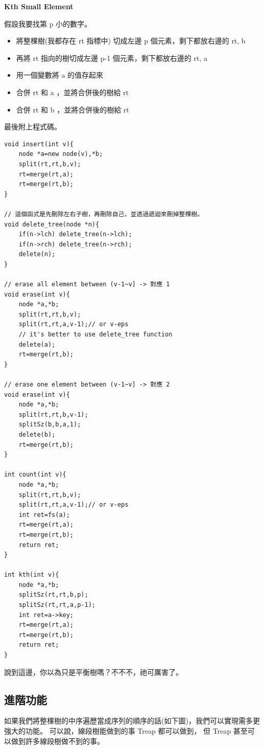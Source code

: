     \textbf{Kth Small Element}

    假設我要找第 p 小的數字。

    \begin{itemize}
        \item 將整棵樹(我都存在 rt 指標中) 切成左邊 p 個元素，剩下都放右邊的 rt, b 
        \item 再將 rt 指向的樹切成左邊 p-1 個元素，剩下都放右邊的 rt, a 
        \item 用一個變數將 a 的值存起來
        \item 合併 rt 和 a ，並將合併後的樹給 rt 
        \item 合併 rt 和 b ，並將合併後的樹給 rt
    \end{itemize}

    最後附上程式碼。

\begin{lstlisting}[caption=Treap 基本功能]
void insert(int v){
    node *a=new node(v),*b;
    split(rt,rt,b,v);
    rt=merge(rt,a);
    rt=merge(rt,b);
}

// 這個函式是先刪除左右子樹，再刪除自己，並透過遞迴來刪掉整棵樹。
void delete_tree(node *n){
    if(n->lch) delete_tree(n->lch);
    if(n->rch) delete_tree(n->rch);
    delete(n);
}

// erase all element between (v-1~v] -> 對應 1
void erase(int v){
    node *a,*b;
    split(rt,rt,b,v);
    split(rt,rt,a,v-1);// or v-eps
    // it's better to use delete_tree function
    delete(a);
    rt=merge(rt,b);
}

// erase one element between (v-1~v] -> 對應 2
void erase(int v){
    node *a,*b;
    split(rt,rt,b,v-1);
    splitSz(b,b,a,1);
    delete(b);
    rt=merge(rt,b);
}

int count(int v){
    node *a,*b;
    split(rt,rt,b,v);
    split(rt,rt,a,v-1);// or v-eps
    int ret=fs(a);
    rt=merge(rt,a);
    rt=merge(rt,b);
    return ret;
}

int kth(int v){
    node *a,*b;
    splitSz(rt,rt,b,p);
    splitSz(rt,rt,a,p-1);
    int ret=a->key;
    rt=merge(rt,a);
    rt=merge(rt,b);
    return ret;
}
\end{lstlisting}

    說到這邊，你以為只是平衡樹嗎？不不不，祂可厲害了。

    \subsection{進階功能}

    如果我們將整棵樹的中序遍歷當成序列的順序的話(如下圖)，我們可以實現需多更強大的功能。
    可以說，線段樹能做到的事 Treap 都可以做到，
    但 Treap 甚至可以做到許多線段樹做不到的事。

